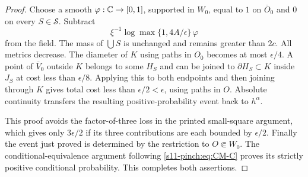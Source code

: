 \documentclass[12pt]{amsart}
\numberwithin{equation}{section}
\begin{document}
\begin{proof}
Choose a smooth $\varphi:\mathbb{C}\to[0,1]$, supported in $W_0$, equal
to $1$ on $\overline O_0$ and $0$ on every $S\in\mathcal S$.
Subtract
\[
 \xi^{-1}\log\max\{1,4A/\epsilon\}\,\varphi
\]
from the field. The mass of $\bigcup S$ is unchanged and
remains greater than $2c$. All metrics decrease. The diameter
of $K$ using paths in $O_0$ becomes at most $\epsilon/4$.
A point of $\overline V_0$ outside $K$ belongs to some $H_S$
and can be joined to $\partial H_S\subset K$ inside $J_S$ at
cost less than $\epsilon/8$. Applying this to both endpoints
and then joining through $K$ gives total cost less than
$\epsilon/2<\epsilon$, using paths in $O$.
Absolute continuity transfers the resulting positive-probability
event back to $h^\alpha$.

This proof avoids the factor-of-three loss in the printed
small-square argument, which gives only $3\epsilon/2$ if its
three contributions are each bounded by $\epsilon/2$.
Finally the event just proved is determined by the restriction
to $O\Subset W_0$. The conditional-equivalence argument following
\eqref{s11-pinch:eq:CM-C} proves its strictly positive conditional
probability. This completes both assertions.
\end{proof}
\end{document}
